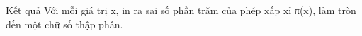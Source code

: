 Kết quả
Với mỗi giá trị x, in ra sai số phần trăm của phép xấp xỉ π(x), làm tròn đến một chữ số thập phân.
